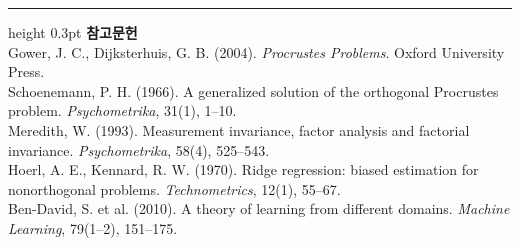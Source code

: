 \documentclass[10pt]{article}
\begin{document}
\vspace{0.6em}
\hrule height 0.3pt
\vspace{0.5em}
{\footnotesize
\textbf{참고문헌}\\[0.3em]
Gower, J. C., Dijksterhuis, G. B. (2004). \emph{Procrustes Problems}.
Oxford University Press.\\[0.15em]
Schoenemann, P. H. (1966). A generalized solution of the orthogonal Procrustes
problem. \emph{Psychometrika}, 31(1), 1--10.\\[0.15em]
Meredith, W. (1993). Measurement invariance, factor analysis and factorial
invariance. \emph{Psychometrika}, 58(4), 525--543.\\[0.15em]
Hoerl, A. E., Kennard, R. W. (1970). Ridge regression: biased estimation for
nonorthogonal problems. \emph{Technometrics}, 12(1), 55--67.\\[0.15em]
Ben-David, S. et al. (2010). A theory of learning from different domains.
\emph{Machine Learning}, 79(1--2), 151--175.
}
\end{document}
